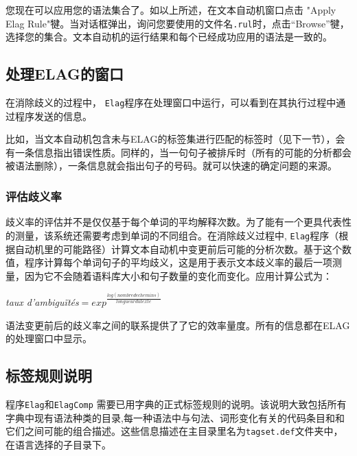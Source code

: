 
\bigskip
\noindent
您现在可以应用您的语法集合了。如以上所述，在文本自动机窗口点击 "Apply Elag Rule"犍。当对话框弹出，询问您要使用的文件名\verb+.rul+时，点击“Browse”犍，选择您的集合。文本自动机的运行结果和每个已经成功应用的语法是一致的。

\subsection{处理ELAG的窗口}
在消除歧义的过程中， \verb+Elag+程序在处理窗口中运行，可以看到在其执行过程中通过程序发送的信息。

\bigskip
\noindent
比如，当文本自动机包含未与ELAG的标签集进行匹配的标签时（见下一节），会有一条信息指出错误性质。同样的，当一句句子被排斥时（所有的可能的分析都会被语法删除），一条信息就会指出句子的号码。就可以快速的确定问题的来源。

\subsubsection{评估歧义率}
歧义率的评估并不是仅仅基于每个单词的平均解释次数。为了能有一个更具代表性的测量，该系统还需要考虑到单词的不同组合。在消除歧义过程中, \verb+Elag+程序（根据自动机里的可能路径）计算文本自动机中变更前后可能的分析次数。基于这个数值，程序计算每个单词句子的平均歧义，这是用于表示文本歧义率的最后一项测量，因为它不会随着语料库大小和句子数量的变化而变化。应用计算公式为：
\bigskip
\begin{center}
	\textit{taux d’ambiguïtés}$=exp^{\frac{log(nombre de chemins)}{longueur du texte}}$
\end{center}


\bigskip \noindent 语法变更前后的歧义率之间的联系提供了了它的效率量度。所有的信息都在ELAG的处理窗口中显示。

\subsection{标签规则说明}
\label{section-elag-tagset}

程序\verb+Elag+和\verb+ElagComp+
需要已用字典的正式标签规则的说明。该说明大致包括所有字典中现有语法种类的目录,每一种语法中与句法、词形变化有关的代码条目和和它们之间可能的组合描述。这些信息描述在主目录里名为\verb$tagset.def$文件夹中，在语言选择的子目录下。




